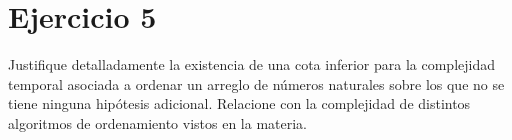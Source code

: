 \section*{Ejercicio 5}

Justifique detalladamente la existencia de una cota inferior para la complejidad temporal asociada a ordenar un arreglo de números naturales sobre los que no se tiene ninguna hipótesis adicional. Relacione con la complejidad de distintos algoritmos de ordenamiento vistos en la materia.
